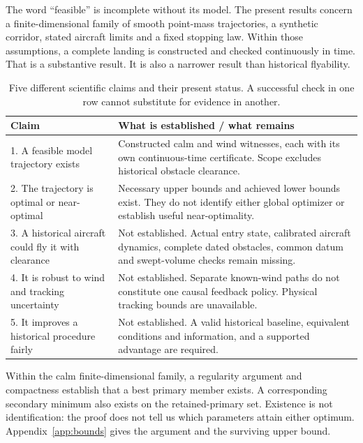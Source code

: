 \label{part:7}
The word ``feasible'' is incomplete without its model. The present results concern a finite-dimensional family of smooth point-mass trajectories, a synthetic corridor, stated aircraft limits and a fixed stopping law. Within those assumptions, a complete landing is constructed and checked continuously in time. That is a substantive result. It is also a narrower result than historical flyability.

\begin{table}[H]\small
\caption{Five different scientific claims and their present status. A successful check in one row cannot substitute for evidence in another.}
\begin{tabularx}{\textwidth}{@{}p{}X@{}}\toprule
Claim & What is established / what remains\\\midrule
1. A feasible model trajectory exists & Constructed calm and wind witnesses, each with its own continuous-time certificate. Scope excludes historical obstacle clearance.\\
2. The trajectory is optimal or near-optimal & Necessary upper bounds and achieved lower bounds exist. They do not identify either global optimizer or establish useful near-optimality.\\
3. A historical aircraft could fly it with clearance & Not established. Actual entry state, calibrated aircraft dynamics, complete dated obstacles, common datum and swept-volume checks remain missing.\\
4. It is robust to wind and tracking uncertainty & Not established. Separate known-wind paths do not constitute one causal feedback policy. Physical tracking bounds are unavailable.\\
5. It improves a historical procedure fairly & Not established. A valid historical baseline, equivalent conditions and information, and a supported advantage are required.\\\bottomrule
\end{tabularx}\end{table}

Within the calm finite-dimensional family, a regularity argument and compactness establish that a best primary member exists. A corresponding secondary minimum also exists on the retained-primary set. Existence is not identification: the proof does not tell us which parameters attain either optimum. Appendix~\ref{app:bounds} gives the argument and the surviving upper bound.

